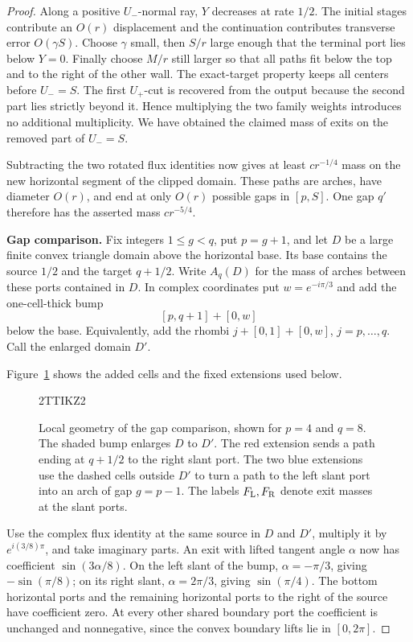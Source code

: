 \documentclass[11pt]{article}
\numberwithin{equation}{section}
\theoremstyle{definition}\newtheorem{definition}[theorem]{Definition}
\theoremstyle{remark}\newtheorem{remark}[theorem]{Remark}
\begin{document}
\begin{proof}
Along a positive $U_-$-normal ray, $Y$ decreases at rate $1/2$.
The initial stages contribute an $O(r)$ displacement and the
continuation contributes transverse error $O(\gamma S)$.
Choose $\gamma$ small, then $S/r$ large enough that the terminal
port lies below $Y=0$.  Finally choose $M/r$ still larger so that
all paths fit below the top and to the right of the other wall.
The exact-target property keeps all centers before $U_-=S$.
The first $U_+$-cut is recovered from the output because the second
part lies strictly beyond it.  Hence multiplying the two family
weights introduces no additional multiplicity.  We have obtained
the claimed mass of exits on the removed part of $U_-=S$.

Subtracting the two rotated flux identities now gives at least
$cr^{-1/4}$ mass on the new horizontal segment of the clipped domain.
These paths are arches, have diameter $O(r)$, and end at only $O(r)$
possible gaps in $[p,S]$.  One gap $q'$ therefore has the asserted
mass $cr^{-5/4}$.

  \textbf{Gap comparison.}
\label{L:cap-gap-comparison}
Fix integers $1\le g<q$, put $p=g+1$, and let $D$ be a large finite
convex triangle domain above the horizontal base.  Its base contains
the source $1/2$ and the target $q+1/2$.  Write $A_q(D)$ for the
mass of arches between these ports contained in $D$.  In complex
coordinates put $w=e^{-i\pi/3}$ and add the one-cell-thick bump
\[
 [p,q+1]+[0,w]
\]
below the base.  Equivalently, add the rhombi
$j+[0,1]+[0,w]$, $j=p,\ldots,q$.  Call the enlarged domain $D'$.

Figure~\ref{L:fig:cap-comparison} shows the added cells and the fixed
extensions used below.
\begin{figure}[htbp]
\centeringZQT2TTIKZ2

\caption{Local geometry of the gap comparison, shown for $p=4$ and $q=8$.
The shaded bump enlarges $D$ to $D'$. The red extension sends a path
ending at $q+1/2$ to the right slant port. The two blue extensions use
the dashed cells outside $D'$ to turn a path to the left slant port
into an arch of gap $g=p-1$. The labels $F_{\rm L},F_{\rm R}$ denote
exit masses at the slant ports.}\label{L:fig:cap-comparison}
\end{figure}

Use the complex flux identity at the same source in $D$ and $D'$,
multiply it by $e^{i(3/8)\pi}$, and take imaginary parts.  An exit
with lifted tangent angle $\alpha$ now has coefficient
$\sin(3\alpha/8)$.  On the left slant of the bump,
$\alpha=-\pi/3$, giving $-\sin(\pi/8)$; on its right slant,
$\alpha=2\pi/3$, giving $\sin(\pi/4)$.  The bottom horizontal
ports and the remaining horizontal ports to the right of the source
have coefficient zero.  At every other shared boundary port the
coefficient is unchanged and nonnegative, since the convex boundary
lifts lie in $[0,2\pi]$.


\end{proof}
\end{document}
